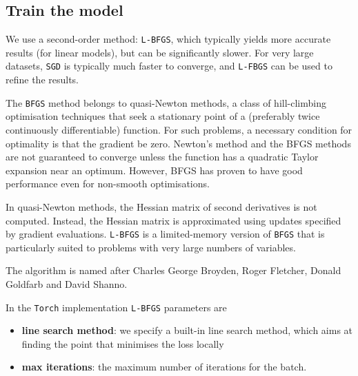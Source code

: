 \subsection*{Train the model}

We use a second-order method: {\tt L-BFGS}, which typically yields
more accurate results (for linear models), but can be significantly
slower. For very large datasets, {\tt SGD} is typically much faster
to converge, and {\tt L-FBGS} can be used to refine the results.

The {\tt BFGS} method belongs to quasi-Newton methods, 
a class of hill-climbing optimisation techniques that seek a stationary point 
of a (preferably twice continuously differentiable) function. 
For such problems, a necessary condition for optimality is that the gradient be zero. 
Newton's method and the BFGS methods are not guaranteed to converge unless 
the function has a quadratic Taylor expansion near an optimum. 
However, BFGS has proven to have good performance even for non-smooth optimisations.

In quasi-Newton methods, the Hessian matrix of second derivatives is not computed. 
Instead, the Hessian matrix is approximated using updates specified by gradient evaluations. 
{\tt L-BFGS} is a limited-memory version of {\tt BFGS} that is particularly suited to problems 
with very large numbers of variables.

The algorithm is named after Charles George Broyden, Roger Fletcher, Donald Goldfarb and David Shanno.

In the {\tt Torch} implementation {\tt L-BFGS} parameters are

\begin{itemize}
\item {\bf line search method}: we specify a built-in line search method, which aims at 
finding the point that minimises the loss locally
\item {\bf max iterations}: the maximum number of iterations for the batch.
\end{itemize}

